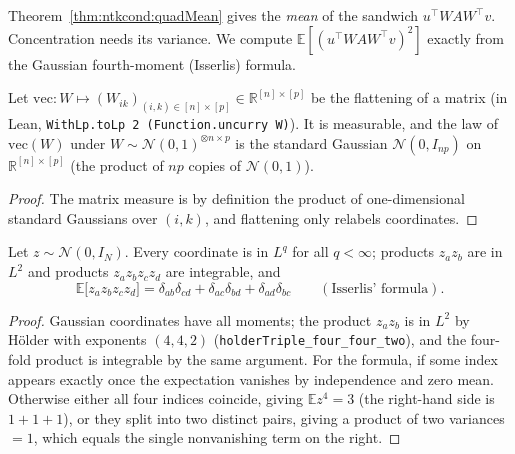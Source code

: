 Theorem~\ref{thm:ntkcond:quadMean} gives the \emph{mean} of the sandwich $u^\top WAW^\top v$. Concentration needs its variance. We compute $\mathbb E[(u^\top WAW^\top v)^2]$ exactly from the Gaussian fourth-moment (Isserlis) formula.

\begin{lemma}\label{lem:ntkcond:coordVec}
  \leanok
Let $\mathrm{vec}:W\mapsto(W_{ik})_{(i,k)\in[n]\times[p]}\in\mathbb R^{[n]\times[p]}$ be the flattening of a matrix (in Lean, \texttt{WithLp.toLp 2 (Function.uncurry W)}). It is measurable, and the law of $\mathrm{vec}(W)$ under $W\sim\mathcal N(0,1)^{\otimes n\times p}$ is the standard Gaussian $\mathcal N(0,I_{np})$ on $\mathbb R^{[n]\times[p]}$ (the product of $np$ copies of $\mathcal N(0,1)$).
\end{lemma}

\begin{proof}
  \leanok
The matrix measure is by definition the product of one-dimensional standard Gaussians over $(i,k)$, and flattening only relabels coordinates.
\end{proof}

\begin{lemma}\label{lem:ntkcond:coordFour}
  \leanok
Let $z\sim\mathcal N(0,I_N)$. Every coordinate is in $L^q$ for all $q<\infty$; products $z_az_b$ are in $L^2$ and products $z_az_bz_cz_d$ are integrable, and
\[
  \mathbb E\bigl[z_az_bz_cz_d\bigr]=\delta_{ab}\delta_{cd}+\delta_{ac}\delta_{bd}+\delta_{ad}\delta_{bc}\qquad(\text{Isserlis' formula}).
\]
\end{lemma}

\begin{proof}
  \leanok
Gaussian coordinates have all moments; the product $z_az_b$ is in $L^2$ by H\"older with exponents $(4,4,2)$ (\texttt{holderTriple\_four\_four\_two}), and the four-fold product is integrable by the same argument. For the formula, if some index appears exactly once the expectation vanishes by independence and zero mean. Otherwise either all four indices coincide, giving $\mathbb E z^4=3$ (the right-hand side is $1+1+1$), or they split into two distinct pairs, giving a product of two variances $=1$, which equals the single nonvanishing term on the right.
\end{proof}

